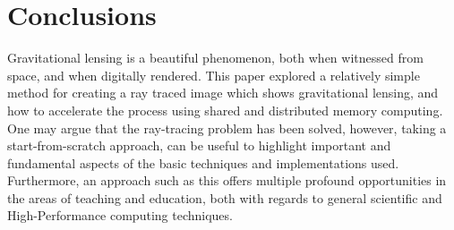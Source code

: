 
\section{Conclusions}
\label{sec:concl}

Gravitational lensing is a beautiful phenomenon, both when witnessed from space, and when digitally rendered.
This paper explored a relatively simple method for creating a ray traced image which shows gravitational lensing, and how to accelerate the process using shared and distributed memory computing.
One may argue that the ray-tracing problem has been solved,
however, taking a start-from-scratch approach, can be useful to highlight important and fundamental aspects of the basic techniques and implementations used.
Furthermore, an approach such as this offers multiple profound opportunities in the areas of teaching and education, both with regards to general scientific and High-Performance computing techniques.

